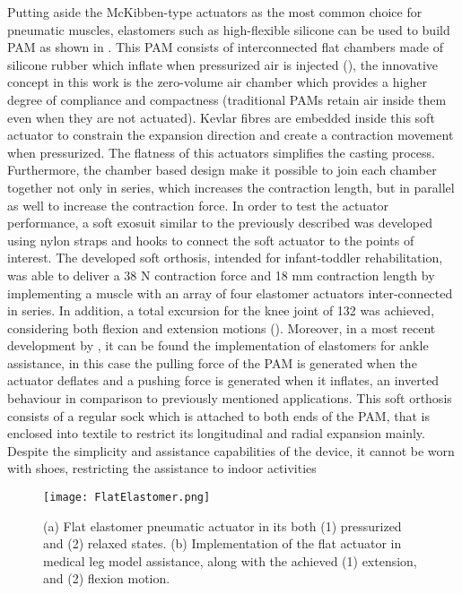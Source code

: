 Putting aside the McKibben-type actuators as the most common choice for pneumatic muscles, elastomers such as high-flexible silicone can be used to build PAM as shown in \cite{Park2014}. This PAM consists of interconnected flat chambers made of silicone rubber which inflate when pressurized air is injected (), the innovative concept in this work is the zero-volume air chamber which provides a higher degree of compliance and compactness (traditional PAMs retain air inside them even when they are not actuated). Kevlar fibres are embedded inside this soft actuator to constrain the expansion direction and create a contraction movement when pressurized. The flatness of this actuators simplifies the casting process. Furthermore, the chamber based design make it possible to join each chamber together not only in series, which increases the contraction length, but in parallel as well to increase the contraction force. In order to test the actuator performance, a soft exosuit similar to the previously described was developed using nylon straps and hooks to connect the soft actuator to the points of interest. The developed soft orthosis, intended for infant-toddler rehabilitation, was able to deliver a 38 N contraction force and 18 mm contraction length by implementing a muscle with an array of four elastomer actuators inter-connected in series. In addition, a total excursion for the knee joint of 132\textdegree{} was achieved, considering both flexion and extension motions (). Moreover, in a most recent development by \cite{Low2016}, it can be found the implementation of elastomers for ankle assistance, in this case the pulling force of the PAM is generated when the actuator deflates and a pushing force is generated when it inflates, an inverted behaviour in comparison to previously mentioned applications. This soft orthosis consists of a regular sock which is attached to both ends of the PAM, that is enclosed into textile to restrict its longitudinal and radial expansion mainly. Despite the simplicity and assistance capabilities of the device, it cannot be worn with shoes, restricting the assistance to indoor activities
\begin{figure}[hbtp!]
    \centering
    \texttt{[image: FlatElastomer.png]}
    \caption{(a) Flat elastomer pneumatic actuator in its both (1) pressurized and (2) relaxed states. (b) Implementation of the flat actuator in medical leg model assistance, along with the achieved (1) extension, and (2) flexion motion. \cite{Park2014} }
    \label{fig:Flat_elastomer}
\end{figure}

